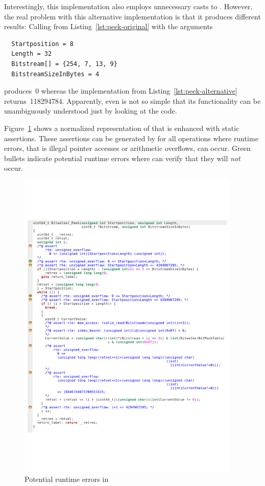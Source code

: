 Interestingly, this implementation also employs unnecessary casts to .
However, the real problem with this alternative implementation is that it produces
different results: Calling \peek from Listing~\ref{lst:peek-original} with the arguments

\begin{verbatim}
  Startposition = 8
  Length = 32
  Bitstream[] = {254, 7, 13, 9}
  BitstreamSizeInBytes = 4
\end{verbatim}

produces~0 whereas the implementation from Listing~\ref{lst:peek-alternative} returns~118294784.
Apparently, even \peek is not so simple that its functionality can be unambiguously
understood just by looking at the code.


\clearpage

Figure~\ref{fig:peek-wp} shows a normalized representation of \peek
that is enhanced with static \acsl assertions.
These assertions can be generated by \framac for all operations where
runtime errors, that is illegal pointer accesses or arithmetic overflows, can occur.
Green bullets indicate potential runtime errors where \framacwp can verify
that they will \emph{not} occur.


\begin{figure}[hbt]
\begin{center}
\includegraphics[width=0.95\textwidth]{figures/peek-wp.pdf}
\caption{\label{fig:peek-wp} Potential runtime errors in \peek}
\end{center}
\end{figure}

